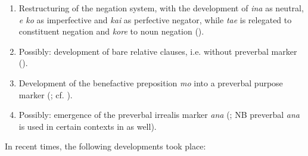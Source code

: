 \begin{enumerate}
\item 
Restructuring of the negation system, with the development of \textit{{\ꞌ}ina} as neutral, \textit{e ko} as imperfective and \textit{kai} as perfective negator, while \textit{ta{\ꞌ}e} is relegated to constituent negation and \textit{kore} to noun negation ().

\largerpage
\item 
Possibly: development of bare relative clauses, i.e. without preverbal marker\\ ().

\item 
Development of the benefactive preposition \textit{mo} into a preverbal purpose marker (; cf. \citealt[27]{FinneyAlexander1998}).

\item 
Possibly: emergence of the preverbal irrealis marker \textit{ana} (; NB preverbal \textit{ana} is used in certain contexts in  as well).

\end{enumerate}

\newpage 
In recent times, the following developments took place:

